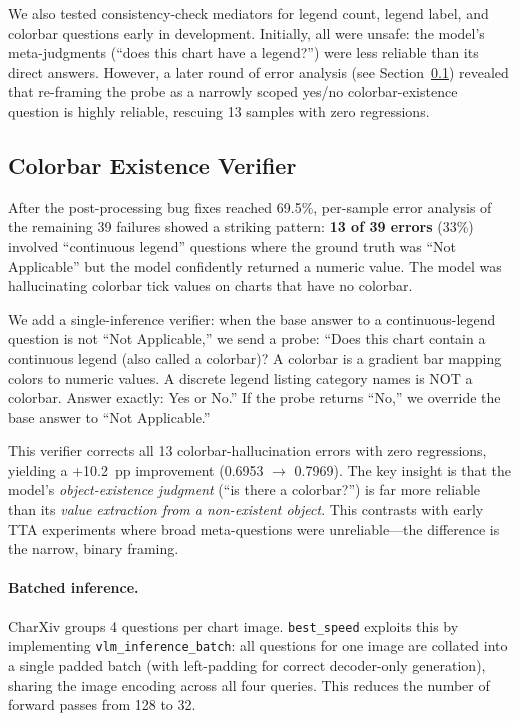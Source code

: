 \documentclass{article}
\begin{document}
We also tested consistency-check mediators for legend count, legend label, and
colorbar questions early in development. Initially, all were unsafe: the model's
meta-judgments (``does this chart have a legend?'') were less reliable than its
direct answers. However, a later round of error analysis (see
Section~\ref{sec:colorbar}) revealed that re-framing the probe as a narrowly
scoped yes/no colorbar-existence question is highly reliable, rescuing 13
samples with zero regressions.

\subsection{Colorbar Existence Verifier}
\label{sec:colorbar}

After the post-processing bug fixes reached 69.5\%, per-sample error analysis
of the remaining 39 failures showed a striking pattern: \textbf{13 of 39
errors} (33\%) involved ``continuous legend'' questions where the ground truth
was ``Not Applicable'' but the model confidently returned a numeric value. The
model was hallucinating colorbar tick values on charts that have no colorbar.

We add a single-inference verifier: when the base answer to a continuous-legend
question is not ``Not Applicable,'' we send a probe: ``Does this chart contain
a continuous legend (also called a colorbar)? A colorbar is a gradient bar
mapping colors to numeric values. A discrete legend listing category names is
NOT a colorbar. Answer exactly: Yes or No.'' If the probe returns ``No,'' we
override the base answer to ``Not Applicable.''

This verifier corrects all 13 colorbar-hallucination errors with zero
regressions, yielding a +10.2~pp improvement (0.6953 $\to$ 0.7969). The key
insight is that the model's \emph{object-existence judgment} (``is there a
colorbar?'') is far more reliable than its \emph{value extraction from a
non-existent object}. This contrasts with early TTA experiments where broad
meta-questions were unreliable---the difference is the narrow, binary framing.

\paragraph{Batched inference.}
CharXiv groups 4 questions per chart image. \texttt{best\_speed} exploits this
by implementing \texttt{vlm\_inference\_batch}: all questions for one image are
collated into a single padded batch (with left-padding for correct decoder-only
generation), sharing the image encoding across all four queries. This reduces
the number of forward passes from 128 to 32.
\end{document}
